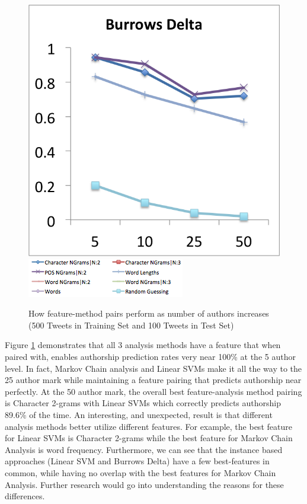 \documentclass[pageno]{jpaper}
\begin{document}
\begin{figure}[h!]
\begin{center}
\includegraphics*[scale=.5]{Top3BurrowsDelta}
\includegraphics*[scale=.9]{featureLegend}
\end{center}
\caption{How feature-method pairs perform as number of authors increases (500 Tweets in Training Set and 100 Tweets in Test Set)}
\label{fig:FeaturesVaryingAuth}
\end{figure}
Figure \ref{fig:FeaturesVaryingAuth} demonstrates that all 3 analysis methods have a feature that when paired with, enables authorship prediction rates very near 100\% at the 5 author level.  In fact, Markov Chain analysis and Linear SVMs make it all the way to the 25 author mark while maintaining a feature pairing that predicts authorship near perfectly.  At the 50 author mark, the overall best feature-analysis method pairing is Character 2-grams with Linear SVMs which correctly predicts authorship 89.6\% of the time.  An interesting, and unexpected, result is that different analysis methods better utilize different features.  For example, the best feature for Linear SVMs is Character 2-grams while the best feature for Markov Chain Analysis is word frequency.  Furthermore, we can see that the instance based approaches (Linear SVM and Burrows Delta) have a few best-features in common, while having no overlap with the best features for Markov Chain Analysis.  Further research would go into understanding the reasons for these differences.
\end{document}
